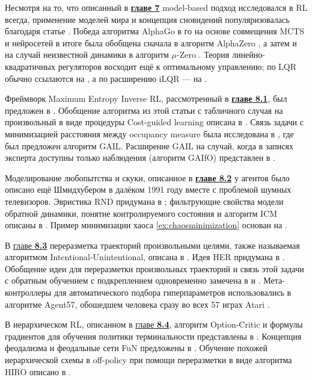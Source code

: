 Несмотря на то, что описанный в \underline{\textbf{главе 7}} model-based подход исследовался в RL всегда, применение моделей мира и концепция сновидений популяризовалась благодаря статье \cite{ha2018world}. Победа алгоритма AlphaGo в го на основе совмещения MCTS и нейросетей в итоге была обобщена сначала в алгоритм AlphaZero \cite{silver2018general}, а затем и на случай неизвестной динамики в алгоритм $\mu$-Zero \cite{schrittwieser2019mastering}. Теория линейно-квадратичных регуляторов восходит ещё к оптимальному управлению; по LQR обычно ссылаются на \cite{bemporad2002explicit}, а по расширению iLQR --- на \cite{li2004iterative}.

Фреймворк Maximum Entropy Inverse RL, рассмотренный в \underline{\textbf{главе 8.1}}, был предложен в \cite{ziebart2008maximum}. Обобщение алгоритма из этой статьи с табличного случая на произвольный в виде процедуры Cost-guided learning описана в \cite{finn2016guided}. Связь задачи с минимизацией расстояния между occupancy measure была исследована в \cite{ho2016generative}, где был предложен алгоритм GAIL. Расширение GAIL на случай, когда в записях эксперта доступны только наблюдения (алгоритм GAIfO) представлен в \cite{torabi2018generative}.

Моделирование любопытства и скуки, описанное в \underline{\textbf{главе 8.2}} у агентов было описано ещё Шмидхубером в далёком 1991 году \cite{schmidhuber1991possibility} вместе с проблемой шумных телевизоров. Эвристика RND придумана в \cite{burda2018exploration}; фильтрующие свойства модели обратной динамики, понятие контролируемого состояния и алгоритм ICM описаны в \cite{pathak2017curiosity}. Пример минимизации хаоса \ref{ex:chaosminimization} основан на \cite{berseth2019smirl}.

В \underline{главе \textbf{8.3}} переразметка траекторий произвольными целями, также называемая алгоритмом Intentional-Unintentional, описана в \cite{cabi2017intentional}. Идея HER придумана в \cite{andrychowicz2017hindsight}. Обобщение идеи для переразметки произвольных траекторий и связь этой задачи с обратным обучением с подкреплением одновременно замечена в \cite{eysenbach2020rewriting} и \cite{li2020generalized}. Мета-контроллеры для автоматического подбора гиперпараметров использовались в алгоритме Agent57, обошедшем человека сразу во всех 57 играх Atari \cite{badia2020agent57}.

В иерархическом RL, описанном в \underline{главе \textbf{8.4}}, алгоритм Option-Critic и формулы градиентов для обучения политики терминальности представлены в \cite{bacon2017option}. Концепция феодализма и феодальные сети FuN предложены в \cite{vezhnevets2017feudal}. Обучение похожей иерархической схемы в off-policy при помощи переразметки в виде алгоритма HIRO описано в \cite{nachum2018data}.

